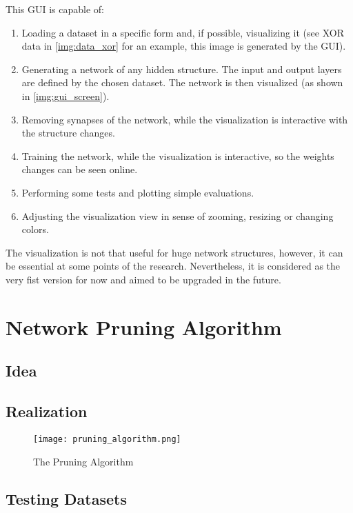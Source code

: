 This GUI is capable of:
\begin{enumerate}
\item Loading a dataset in a specific form and, if possible, visualizing it (see XOR data in \cref{img:data_xor} for an example, this image is generated by the GUI).
\item Generating a network of any hidden structure. The input and output layers are defined by the chosen dataset. The network is then visualized (as shown in \cref{img:gui_screen}).
\item Removing synapses of the network, while the visualization is interactive with the structure changes.
\item Training the network, while the visualization is interactive, so the weights changes can be seen online.
\item Performing some tests and plotting simple evaluations.
\item Adjusting the visualization view in sense of zooming, resizing or changing colors.
\end{enumerate}

The visualization is not that useful for huge network structures, however, it can be essential at some points of the research. Nevertheless, it is considered as the very fist version for now and aimed to be upgraded in the future.

\newpage
\section{Network Pruning Algorithm} \label{sec:network_pruning_algorithm}

\subsection{Idea}

\subsection{Realization}

\begin{figure}[H]
  \centering
  \texttt{[image: pruning\_algorithm.png]}
  \caption{The Pruning Algorithm}
  \label{img:pruning_algorithm}
\end{figure}

\subsection{Testing Datasets}

